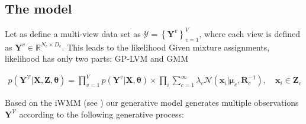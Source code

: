 \documentclass[]{article}
\newcommand{\gD}[2]{\mathcal{N}\left(#1,#2\right)}
\begin{document}

\subsection{The model}

Let as define a multi-view data set as $\mathcal{Y}=\left\{\mathbf{Y}^{v}\right\}_{v=1}^{V}$, where each view is defined as $\mathbf{Y}^{v}\in \mathbb{R}^{N_v\times D_v}$. This leads to the likelihood Given mixture assignments, likelihood has only two parts:
GP-LVM and GMM

\begin{align}
p\left(\mathbf{Y}^{\mathcal{V}}|\mathbf{X},\mathbf{Z},\boldsymbol{\theta}\right) = \prod_{v=1}^{V}p(\mathbf{Y}^v|\mathbf{X},\boldsymbol{\theta})\times \prod_{i}\sum_{c=1}^{\infty} \lambda_c\gD{\mathbf{x}_i|\boldsymbol{\mu}_c}{\mathbf{R}_c^{-1}} ,\quad \mathbf{x}_i \in \mathbf{Z}_c
\end{align}


Based on the iWMM (see \cite{IwaDuvGha2012warped}) our generative model generates multiple observations $\mathbf{Y}^{\mathcal{V}}$ according to the following generative process:
\end{document}

